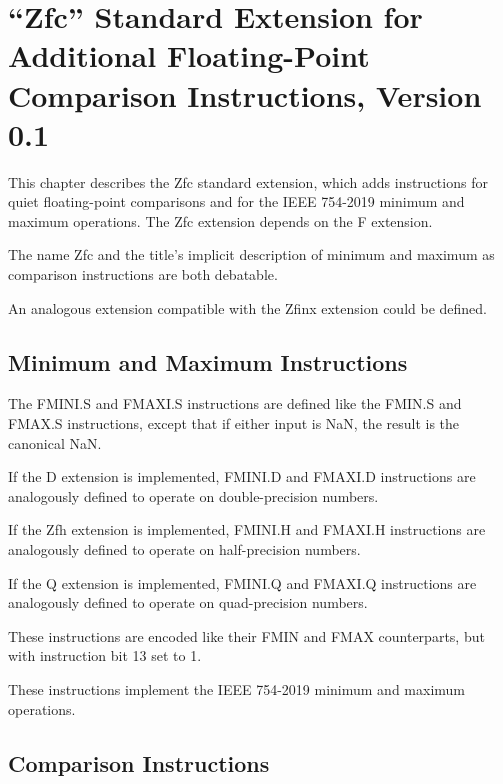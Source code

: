 \chapter{``Zfc'' Standard Extension for Additional Floating-Point Comparison
Instructions, Version 0.1}
\label{sec:zfc}

This chapter describes the Zfc standard extension, which adds instructions for
quiet floating-point comparisons and for the IEEE 754-2019 minimum and maximum
operations.
The Zfc extension depends on the F extension.

\begin{commentary}
The name Zfc and the title's implicit description of minimum and maximum as
comparison instructions are both debatable.
\end{commentary}

\begin{commentary}
An analogous extension compatible with the Zfinx extension could be defined.
\end{commentary}

\section{Minimum and Maximum Instructions}

The FMINI.S and FMAXI.S instructions are defined like the FMIN.S and FMAX.S
instructions, except that if either input is NaN, the result is the
canonical NaN.

If the D extension is implemented, FMINI.D and FMAXI.D instructions are
analogously defined to operate on double-precision numbers.

If the Zfh extension is implemented, FMINI.H and FMAXI.H instructions are
analogously defined to operate on half-precision numbers.

If the Q extension is implemented, FMINI.Q and FMAXI.Q instructions are
analogously defined to operate on quad-precision numbers.

These instructions are encoded like their FMIN and FMAX counterparts, but
with instruction bit 13 set to 1.

\begin{commentary}
These instructions implement the IEEE 754-2019 minimum and maximum operations.
\end{commentary}


\section{Comparison Instructions}

